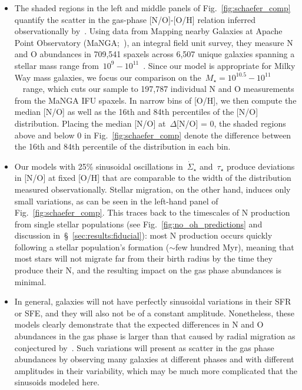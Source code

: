 \documentclass[ms.tex]{subfiles}
\begin{document}
\begin{itemize}
	\item The shaded regions in the left and middle panels of 
	Fig.~\ref{fig:schaefer_comp} quantify the scatter in the gas-phase 
	[N/O]-[O/H] relation inferred observationally by~\citet{Schaefer2020}. 
	Using data from Mapping nearby Galaxies at Apache Point Observatory 
	(MaNGA;~\citealp{Bundy2015}), an integral field unit survey, they measure 
	N and O abundances in 709,541 spaxels across 6,507 unique galaxies spanning 
	a stellar mass range from~$10^9 - 10^{11}$~\msun. 
	Since our model is appropriate for Milky Way mass galaxies, we focus our 
	comparison on the~$M_\star = 10^{10.5} - 10^{11}$~\msun~range, which cuts 
	our sample to 197,787 individual N and O measurements from the MaNGA IFU 
	spaxels. 
	In narrow bins of [O/H], we then compute the median [N/O] as well as the 
	16th and 84th percentiles of the [N/O] distribution. 
	Placing the median [N/O] at~$\Delta$[N/O] = 0, the shaded regions above and 
	below 0 in Fig.~\ref{fig:schaefer_comp} denote the difference between the 
	16th and 84th percentile of the distribution in each bin. 

	\item Our models with 25\% sinusoidal oscillations in~$\dot{\Sigma}_\star$ 
	and~$\tau_\star$ produce deviations in [N/O] at fixed [O/H] that are 
	comparable to the width of the distribution measured observationally. 
	Stellar migration, on the other hand, induces only small variations, as can 
	be seen in the left-hand panel of Fig.~\ref{fig:schaefer_comp}. 
	This traces back to the timescales of N production from single stellar 
	populations (see Fig.~\ref{fig:no_oh_predictions} and discussion 
	in~\S~\ref{sec:results:fiducial}): most N production occurs quickly 
	following a stellar population's formation ($\sim$few hundred Myr), meaning 
	that most stars will not migrate far from their birth radius by the time 
	they produce their N, and the resulting impact on the gas phase abundances 
	is minimal. 

	\item In general, galaxies will not have perfectly sinusoidal variations in 
	their SFR or SFE, and they will also not be of a constant amplitude. 
	Nonetheless, these models clearly demonstrate that the expected differences 
	in N and O abundances in the gas phase is larger than that caused by radial 
	migration as conjectured by~\citet{Schaefer2020}. 
	Such variations will present as scatter in the gas phase abundances by 
	observing many galaxies at different phases and with different amplitudes 
	in their variability, which may be much more complicated that the sinusoids 
	modeled here. 
\end{itemize} 
\end{document}
